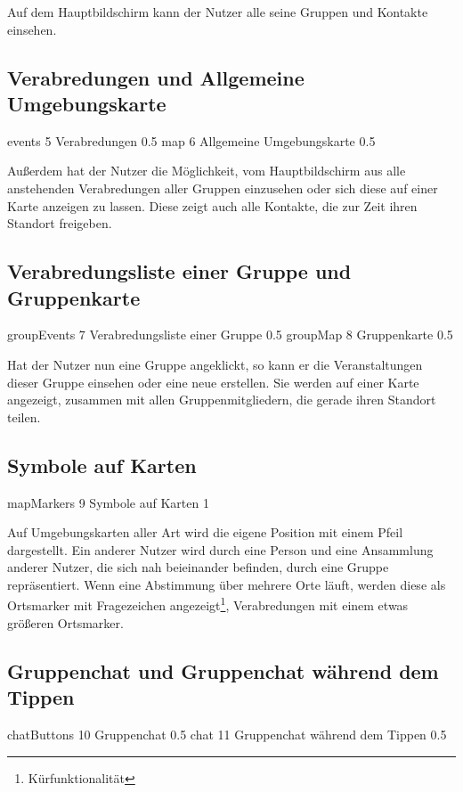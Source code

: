 \documentclass[parskip=full,11pt]{scrartcl}
\begin{document}
Auf dem Hauptbildschirm kann der Nutzer alle seine Gruppen und Kontakte einsehen.

\subsection{Verabredungen und Allgemeine Umgebungskarte}
{events}
{5}
{Verabredungen}
{0.5}
{map}
{6}
{Allgemeine Umgebungskarte}
{0.5}

Außerdem hat der Nutzer die Möglichkeit, vom Hauptbildschirm aus alle anstehenden Verabredungen aller Gruppen einzusehen oder sich diese auf einer Karte anzeigen zu lassen. 
Diese zeigt auch alle Kontakte, die zur Zeit ihren Standort freigeben.

\subsection{Verabredungsliste einer Gruppe und Gruppenkarte}
{groupEvents}
{7}
{Verabredungsliste einer Gruppe}
{0.5}
{groupMap}
{8}
{Gruppenkarte}
{0.5}

Hat der Nutzer nun eine Gruppe angeklickt, so kann er die Veranstaltungen dieser Gruppe einsehen oder eine neue erstellen.
Sie werden auf einer Karte angezeigt, zusammen mit allen Gruppenmitgliedern, die gerade ihren Standort teilen.

\subsection{Symbole auf Karten}
{mapMarkers}
{9}
{Symbole auf Karten}
{1}

Auf Umgebungskarten aller Art wird die eigene Position mit einem Pfeil dargestellt. 
Ein anderer Nutzer wird durch eine Person und eine Ansammlung anderer Nutzer, die sich nah beieinander befinden, durch eine Gruppe repräsentiert.
Wenn eine Abstimmung über mehrere Orte läuft, werden diese als Ortsmarker mit Fragezeichen angezeigt\footnote[1]{Kürfunktionalität}, Verabredungen mit einem etwas größeren Ortsmarker.

\subsection{Gruppenchat und Gruppenchat während dem Tippen}
{chatButtons}
{10}
{Gruppenchat}
{0.5}
{chat}
{11}
{Gruppenchat während dem Tippen}
{0.5}
\end{document}
